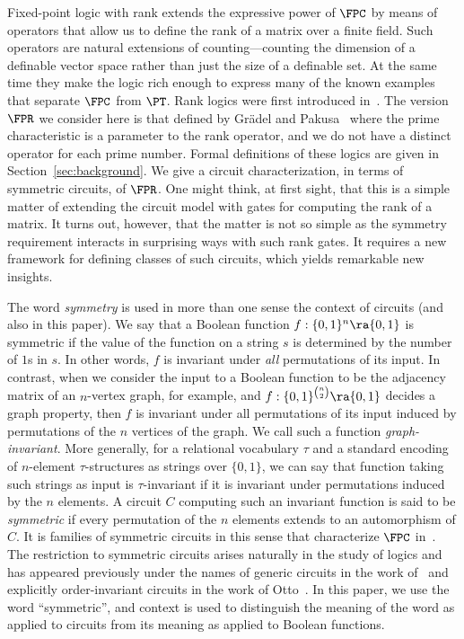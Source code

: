 \documentclass[a4paper,UKenglish]{lipics-v2018}
\begin{document}
Fixed-point logic with rank extends the expressive power of $\FPC$ by means of
operators that allow us to define the rank of a matrix over a finite field. Such
operators are natural extensions of counting---counting the dimension of a
definable vector space rather than just the size of a definable set. At the same
time they make the logic rich enough to express many of the known examples that
separate $\FPC$ from $\PT$. Rank logics were first introduced
in~\cite{Dawar09logicswith}. The version $\FPR$ we consider here is that defined
by Gr\"adel and Pakusa~\cite{GradelP15a} where the prime characteristic is a
parameter to the rank operator, and we do not have a distinct operator for each
prime number. Formal definitions of these logics are given in
Section~\ref{sec:background}. We give a circuit characterization, in terms of
symmetric circuits, of $\FPR$. One might think, at first sight, that this is a
simple matter of extending the circuit model with gates for computing the rank
of a matrix. It turns out, however, that the matter is not so simple as the
symmetry requirement interacts in surprising ways with such rank gates. It
requires a new framework for defining classes of such circuits, which yields
remarkable new insights.

The word \emph{symmetry} is used in more than one sense
the context of circuits (and also in this paper). We say that a Boolean function
$f:\{0,1\}^n \ra \{0,1\}$ is symmetric if the value of the function on a string
$s$ is determined by the number of $1$s in $s$. In other words, $f$ is invariant
under \emph{all} permutations of its input. In contrast, when we consider the
input to a Boolean function to be the adjacency matrix of an $n$-vertex graph,
for example, and $f : \{0,1\}^{n \choose 2} \ra \{0,1\}$ decides a graph
property, then $f$ is invariant under all permutations of its input induced by
permutations of the $n$ vertices of the graph. We call such a function
\emph{graph-invariant}. More generally, for a relational vocabulary $\tau$ and a
standard encoding of $n$-element $\tau$-structures as strings over $\{0,1\}$, we
can say that function taking such strings as input is $\tau$-invariant if it is
invariant under permutations induced by the $n$ elements. A circuit $C$
computing such an invariant function is said to be \emph{symmetric} if every
permutation of the $n$ elements extends to an automorphism of $C$. It is
families of symmetric circuits in this sense that characterize $\FPC$
in~\cite{AndersonD17}. The restriction to symmetric circuits arises naturally in
the study of logics and has appeared previously under the names of generic
circuits in the work of~\cite{DENENBERG1986216} and explicitly order-invariant
circuits in the work of Otto~\cite{Otto1997}.  In this paper, we use
the word ``symmetric'', and context is used to distinguish the meaning
of the word as applied to circuits from its meaning as applied to
Boolean functions.
\end{document}
